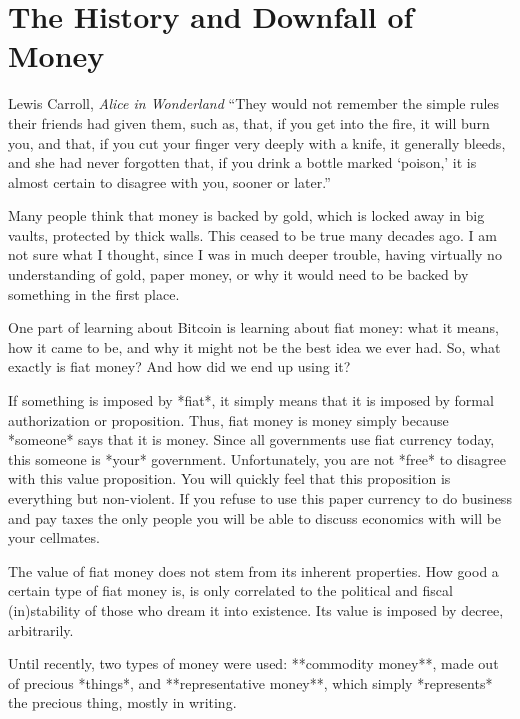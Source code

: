 \chapter{ The History and Downfall of Money}
\label{les:12}

\begin{chapquote}{Lewis Carroll, \textit{Alice in Wonderland}}
``They would not remember the simple rules their friends had given them, such
as, that, if you get into the fire, it will burn you, and that, if you cut your
finger very deeply with a knife, it generally bleeds, and she had never
forgotten that, if you drink a bottle marked `poison,' it is almost certain to
disagree with you, sooner or later.''
\end{chapquote}

Many people think that money is backed by gold, which is locked away in
big vaults, protected by thick
walls. This ceased to be true many decades ago. I am not sure what I
thought, since I was in much deeper trouble, having virtually no
understanding of gold, paper money, or why it would need to be backed by
something in the first place.

One part of learning about Bitcoin is learning about fiat money: what it
means, how it came to be, and why it might not be the best idea we ever
had. So, what exactly is fiat money? And how did we end up using it?

If something is imposed by *fiat*, it simply means that it is imposed by
formal authorization or proposition. Thus, fiat money is money simply
because *someone* says that it is money. Since all governments use fiat
currency today, this someone is *your* government. Unfortunately, you
are not *free* to disagree with this value proposition. You will quickly
feel that this proposition is everything but non-violent. If you refuse
to use this paper currency to do business and pay taxes the only people
you will be able to discuss economics with will be your cellmates.

The value of fiat money does not stem from its inherent properties. How
good a certain type of fiat money is, is only correlated to the
political and fiscal (in)stability of those who dream it into existence.
Its value is imposed by decree, arbitrarily.


Until recently, two types of money were used: **commodity money**, made
out of precious *things*, and **representative money**, which simply
*represents* the precious thing, mostly in writing.

